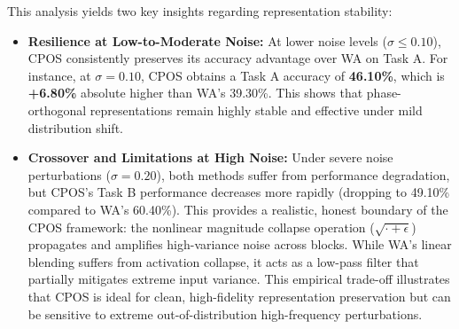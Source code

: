 \documentclass{article}
\theoremstyle{plain}
\theoremstyle{definition}
\theoremstyle{remark}
\begin{document}
This analysis yields two key insights regarding representation stability:
\begin{itemize}
\item \textbf{Resilience at Low-to-Moderate Noise:} At lower noise levels ($\sigma \le 0.10$), CPOS consistently preserves its accuracy advantage over WA on Task A. For instance, at $\sigma = 0.10$, CPOS obtains a Task A accuracy of \textbf{46.10\%}, which is \textbf{+6.80\%} absolute higher than WA's 39.30\%. This shows that phase-orthogonal representations remain highly stable and effective under mild distribution shift.
\item \textbf{Crossover and Limitations at High Noise:} Under severe noise perturbations ($\sigma = 0.20$), both methods suffer from performance degradation, but CPOS's Task B performance decreases more rapidly (dropping to 49.10\% compared to WA's 60.40\%). This provides a realistic, honest boundary of the CPOS framework: the nonlinear magnitude collapse operation ($\sqrt{\cdot + \epsilon}$) propagates and amplifies high-variance noise across blocks. While WA's linear blending suffers from activation collapse, it acts as a low-pass filter that partially mitigates extreme input variance. This empirical trade-off illustrates that CPOS is ideal for clean, high-fidelity representation preservation but can be sensitive to extreme out-of-distribution high-frequency perturbations.
\end{itemize}
\end{document}
